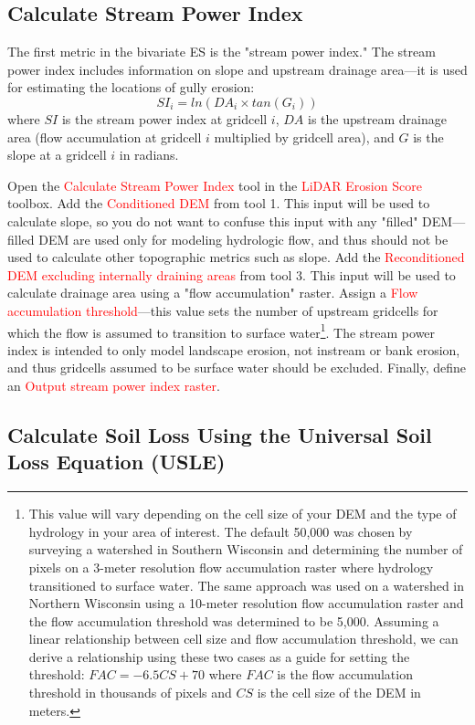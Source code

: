 \documentclass{article}
\newcommand{\toolPar}[1]{\textcolor{red}{#1}}
\begin{document}
	\subsection{Calculate Stream Power Index}
		The first metric in the bivariate ES is the "stream power index." The stream power index includes information on slope and upstream drainage area---it is used for estimating the locations of gully erosion:
		\begin{equation}
			SI_{i} = ln(DA_{i} \times tan(G_{i}))
		\end{equation}
		where $SI$ is the stream power index at gridcell $i$, $DA$ is the upstream drainage area (flow accumulation at gridcell $i$ multiplied by gridcell area), and $G$ is the slope at a gridcell $i$ in radians.
		
		Open the \toolPar{Calculate Stream Power Index} tool in the \toolPar{LiDAR Erosion Score} toolbox. Add the \toolPar{Conditioned DEM} from tool 1. This input will be used to calculate slope, so you do not want to confuse this input with any "filled" DEM---filled DEM are used only for modeling hydrologic flow, and thus should not be used to calculate other topographic metrics such as slope. Add the \toolPar{Reconditioned DEM excluding internally draining areas} from tool 3. This input will be used to calculate drainage area using a "flow accumulation" raster. Assign a \toolPar{Flow accumulation threshold}---this value sets the number of upstream gridcells for which the flow is assumed to transition to surface water\footnote{This value will vary depending on the cell size of your DEM and the type of hydrology in your area of interest. The default 50,000 was chosen by surveying a watershed in Southern Wisconsin and determining the number of pixels on a 3-meter resolution flow accumulation raster where hydrology transitioned to surface water. The same approach was used on a watershed in Northern Wisconsin using a 10-meter resolution flow accumulation raster and the flow accumulation threshold was determined to be 5,000. Assuming a linear relationship between cell size and flow accumulation threshold, we can derive a relationship using these two cases as a guide for setting the threshold: $FAC = -6.5CS + 70$ where $FAC$ is the flow accumulation threshold in thousands of pixels and $CS$ is the cell size of the DEM in meters.}. The stream power index is intended to only model landscape erosion, not instream or bank erosion, and thus gridcells assumed to be surface water should be excluded. Finally, define an \toolPar{Output stream power index raster}.
	\subsection{Calculate Soil Loss Using the Universal Soil Loss Equation (USLE)}
\end{document}
